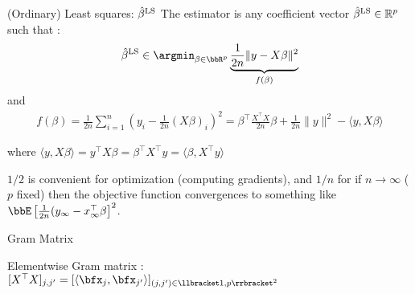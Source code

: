 \documentclass[unknownkeysallowed]{beamer}
\begin{document}
\begin{frame}{(Ordinary) Least squares:  $\hat\beta^{\rm LS}$}
The  estimator is any coefficient vector
$\hat\beta^{\rm LS}\in\mathbb{R}^p$ such that :
\newline
\begin{align*}
\hat\beta^{\rm LS} \in \argmin_{\beta \in \bbR^p}
\underbrace{\frac{1}{2n}\|y-X\beta\|^2}_{f(\beta)}
\end{align*}
\vspace{0.25cm}
and
\begin{align*}
	f(\beta)
	= \frac{1}{2n}\sum_{i=1}^n (y_{i}-\frac{1}{2n}(X\beta)_{i})^2
	= \beta^{\top}\frac{X^{\top}X}{2n}\beta+\frac{1}{2n}\|y\|^2- \langle y,X\beta\rangle
\end{align*}

\vspace{0.25cm}

where
$\langle y,X\beta\rangle=y^{\top}X\beta=\beta^{\top}X^{\top}y=\langle \beta,X^{\top}y\rangle$

\vspace{0.5cm}

\rem $1/2$ is convenient for optimization (computing gradients), and $1/n$ for if $n\to\infty$ ($p$ fixed) then the objective function convergences to something like $\bbE\left[\frac{1}{2n} (y_{\infty}-x^\top_{\infty} \beta\right]^2$.

\end{frame}


\begin{frame}{Gram Matrix}

\vspace{1cm}
Elementwise Gram matrix :
$[X^{\top}X]_{j,j'}
=
[\langle \bfx_{j}, \bfx_{j'}\rangle]_{(j,j') \in \llbracket 1,p \rrbracket^2}$


\end{frame}
\end{document}
